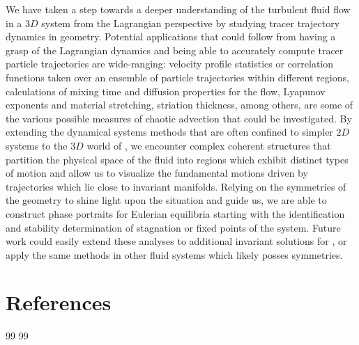 \documentclass[lineno]{jfm}
\begin{document}
We have taken a step towards a deeper understanding of the  turbulent 
fluid flow in a $3D$ system from the Lagrangian perspective by studying 
tracer trajectory dynamics in {\pC} geometry. Potential 
applications that could follow from having a grasp of the Lagrangian 
dynamics and being able to accurately compute tracer particle 
trajectories are wide-ranging: velocity profile statistics or correlation 
functions taken over an ensemble of particle trajectories within 
different regions, calculations of mixing time and diffusion properties 
for the flow, Lyapunov exponents and material stretching, striation 
thickness, among others, are some of the various possible measures of 
chaotic advection that could be investigated. By extending the dynamical 
systems methods that are often confined to simpler $2D$ systems to the 
$3D$ world of {\pCf}, we encounter complex coherent structures that 
partition the physical space of the fluid into regions which exhibit 
distinct types of motion and allow us to visualize the fundamental 
motions driven by trajectories which lie close to invariant manifolds. 
Relying on the symmetries of the geometry to shine light upon the 
situation and guide us, we are able to construct phase portraits for 
{\pC} Eulerian equilibria starting with the identification and stability 
determination of stagnation or fixed points of the system. Future work 
could easily extend these analyses to additional invariant solutions for 
{\pCf}, or apply the same methods in other fluid systems which likely 
posses symmetries. 

\fi %

    \ifsubmission
\section*{References}
{99} %
    \else
{99} %
    \fi
\end{document}

